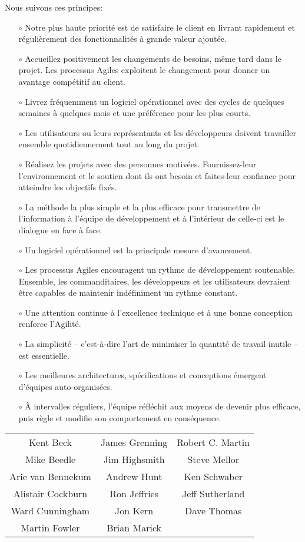 \documentclass[11pt,a4paper]{article}
\begin{document}
Nous suivons ces principes:
\begin{itemize}
\item[$\circ$] Notre plus haute priorité est de satisfaire le client
en livrant rapidement et régulièrement des fonctionnalités
à grande valeur ajoutée.
\item[$\circ$] Accueillez positivement les changements de besoins,
même tard dans le projet. Les processus Agiles
exploitent le changement pour donner un avantage
compétitif au client.
\item[$\circ$] Livrez fréquemment un logiciel opérationnel avec des
cycles de quelques semaines à quelques mois et une
préférence pour les plus courts.
\item[$\circ$] Les utilisateurs ou leurs représentants et les
développeurs doivent travailler ensemble quotidiennement
tout au long du projet.
\item[$\circ$] Réalisez les projets avec des personnes motivées.
Fournissez-leur l’environnement et le soutien dont ils
ont besoin et faites-leur confiance pour atteindre les
objectifs fixés.
\item[$\circ$] La méthode la plus simple et la plus efficace pour
transmettre de l’information à l'équipe de développement
et à l’intérieur de celle-ci est le dialogue en face à face.
\item[$\circ$] Un logiciel opérationnel est la principale mesure d’avancement.
\item[$\circ$] Les processus Agiles encouragent un rythme de développement
soutenable. Ensemble, les commanditaires, les développeurs
et les utilisateurs devraient être capables de maintenir
indéfiniment un rythme constant.
\item[$\circ$] Une attention continue à l'excellence technique et
à une bonne conception renforce l’Agilité.
\item[$\circ$] La simplicité -- c’est-à-dire l’art de minimiser la
quantité de travail inutile -- est essentielle.
\item[$\circ$] Les meilleures architectures, spécifications et
conceptions émergent d'équipes auto-organisées.
\item[$\circ$] À intervalles réguliers, l'équipe réfléchit aux moyens
de devenir plus efficace, puis règle et modifie son
comportement en conséquence.
\end{itemize}


\vspace{5mm}


\begin{center}
\begin{tabular}{ccc}
Kent Beck & James Grenning & Robert C. Martin \\ 
Mike Beedle & Jim Highsmith & Steve Mellor \\ 
Arie van Bennekum & Andrew Hunt & Ken Schwaber \\ 
Alistair Cockburn & Ron Jeffries & Jeff Sutherland \\ 
Ward Cunningham & Jon Kern & Dave Thomas \\ 
Martin Fowler & Brian Marick & ~ \\ 
\end{tabular} 
\end{center}
\end{document}
